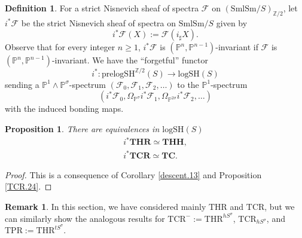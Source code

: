 \documentclass[10pt]{amsart}
\newtheorem{prop}[thm]{Proposition}
\theoremstyle{definition}
\newtheorem{df}[thm]{Definition}
\newtheorem{rmk}[thm]{Remark}
\theoremstyle{remark}
\numberwithin{equation}{section}
\renewcommand{\P}{\mathbb{P}}
\newcommand{\cF}{\mathcal{F}}
\newcommand{\SmlSm}{\mathrm{SmlSm}}
\newcommand{\logSH}{\mathrm{logSH}}
\newcommand{\THR}{\mathrm{THR}}
\newcommand{\TCR}{\mathrm{TCR}}
\newcommand{\TPR}{\mathrm{TPR}}
\newcommand{\bTHH}{\mathbf{THH}}
\newcommand{\bTCR}{\mathbf{TCR}}
\newcommand{\bTC}{\mathbf{TC}}
\newcommand{\bTHR}{\mathbf{THR}}
\newcommand{\prelogSH}{\mathrm{prelogSH}}
\newcommand{\Ztwo}{{\mathbb{Z}/2}}
\begin{document}
\begin{df}
\label{mot.13}
For a strict Nisnevich sheaf of spectra $\cF$ on $(\SmlSm/S)_{\Ztwo}$,
let $i^*\cF$ be the strict Nisnevich sheaf of spectra on $\SmlSm/S$ given by
\[
i^*\cF(X)
:=
\cF(i_\sharp X).
\]
Observe that for every integer $n\geq 1$,
$i^*\cF$ is $(\P^n,\P^{n-1})$-invariant if $\cF$ is $(\P^n,\P^{n-1})$-invariant.
We have the ``forgetful'' functor
\[
i^*
\colon
\prelogSH^{\Ztwo}(S)
\to
\logSH(S)
\]
sending a $\P^1\wedge \P^\sigma$-spectrum $(\cF_0,\cF_1,\cF_2,\ldots)$ to the $\P^1$-spectrum
\[
(i^*\cF_0,\Omega_{\P^\sigma}i^*\cF_1,\Omega_{\P^{2\sigma}} i^*\cF_2,\ldots)
\]
with the induced bonding maps.
\end{df}

\begin{prop}
\label{mot.14}
There are equivalences in $\logSH(S)$
\begin{gather*}
i^*\bTHR
\simeq
\bTHH,
\\
i^*\bTCR
\simeq
\bTC.
\end{gather*}
\end{prop}
\begin{proof}
This is a consequence of Corollary \ref{descent.13} and Proposition \ref{TCR.24}.
\end{proof}


\begin{rmk}
In this section,
we have considered mainly $\THR$ and $\TCR$,
but we can similarly show the analogous results for $\TCR^-:=\THR^{hS^\sigma}$, $\TCR_{hS^\sigma}$, and $\TPR:=\THR^{tS^\sigma}$.
\end{rmk}






\end{document}
